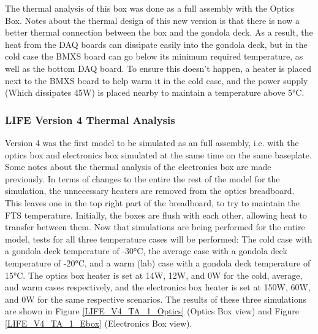 The thermal analysis of this box was done as a full assembly with the Optics Box. Notes about the thermal design of this new version is that there is now a better thermal connection between the box and the gondola deck. As a result, the heat from the DAQ boards can dissipate easily into the gondola deck, but in the cold case the BMXS board can go below its minimum required temperature, as well as the bottom DAQ board. To ensure this doesn't happen, a heater is placed next to the BMXS board to help warm it in the cold case, and the power supply (Which dissipates 45W) is placed nearby to maintain a temperature above 5°C.

\subsubsection{LIFE Version 4 Thermal Analysis}
Version 4 was the first model to be simulated as an full assembly, i.e. with the optics box and electronics box simulated at the same time on the same baseplate. Some notes about the thermal analysis of the electronics box are made previously. In terms of changes to the entire the rest of the model for the simulation, the unnecessary heaters are removed from the optics breadboard. This leaves one in the top right part of the breadboard, to try to maintain the FTS temperature. Initially, the boxes are flush with each other, allowing heat to transfer between them. Now that simulations are being performed for the entire model, tests for all three temperature cases will be performed: The cold case with a gondola deck temperature of -30°C, the average case with a gondola deck temperature of -20°C, and a warm (lab) case with a gondola deck temperature of 15°C. The optics box heater is set at 14W, 12W, and 0W for the cold, average, and warm cases respectively, and the electronics box heater is set at 150W, 60W, and 0W for the same respective scenarios. The results of these three simulations are shown in Figure \ref{LIFE_V4_TA_1_Optics} (Optics Box view) and Figure \ref{LIFE_V4_TA_1_Ebox} (Electronics Box view).

